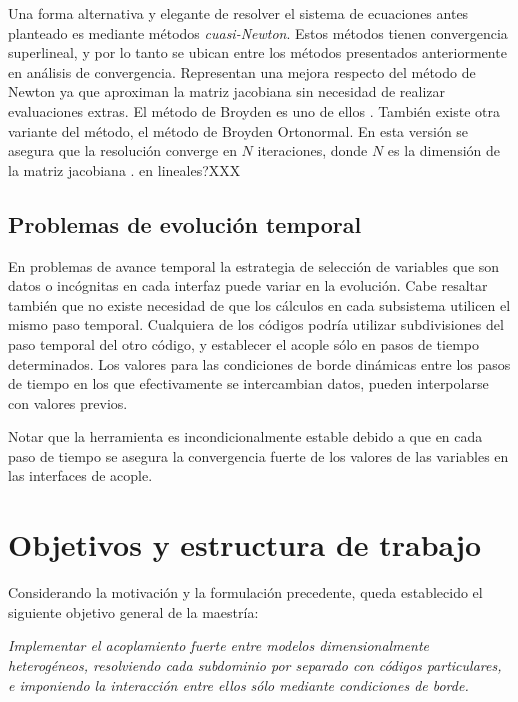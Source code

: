 Una forma alternativa y elegante de resolver el sistema de ecuaciones antes planteado es mediante métodos \textit{cuasi-Newton}.
Estos métodos tienen convergencia superlineal, y por lo tanto se ubican entre los métodos presentados anteriormente en análisis de convergencia. 
Representan una mejora respecto del método de Newton ya que aproximan la matriz jacobiana sin necesidad de realizar evaluaciones extras. 
El método de Broyden es uno de ellos \cite{broyden}.
También existe otra variante del método, el método de Broyden Ortonormal.
En esta versión se asegura que la resolución converge en $N$ iteraciones, donde $N$ es la dimensión de la matriz jacobiana \cite{broyden-on}.
en lineales?XXX

\subsection{Problemas de evolución temporal}
\label{1:evolucion}
En problemas de avance temporal la estrategia de selección de variables que son datos o incógnitas en cada interfaz puede variar en la evolución.
Cabe resaltar también que no existe necesidad de que los cálculos en cada subsistema utilicen el mismo paso temporal.
Cualquiera de los códigos podría utilizar subdivisiones del paso temporal del otro código,
y establecer el acople sólo en pasos de tiempo determinados.
Los valores para las condiciones de borde dinámicas entre los pasos de tiempo en los que efectivamente se intercambian datos,
pueden interpolarse con valores previos.

Notar que la herramienta es incondicionalmente estable debido a que 
en cada paso de tiempo se asegura la convergencia fuerte de los valores de las variables en las interfaces de acople.

\section{Objetivos y estructura de trabajo}
\label{1:objetivos}
Considerando la motivación y la formulación precedente, queda establecido el siguiente objetivo general de la maestría:

\vspace{1em}
\begin{addmargin}[1.5em]{1.5em}
\textit{Implementar el acoplamiento fuerte entre modelos dimensionalmente heterogéneos,
resolviendo cada subdominio por separado con códigos particulares, e imponiendo la
interacción entre ellos sólo mediante condiciones de borde.}
\end{addmargin}
\vspace{1em}

